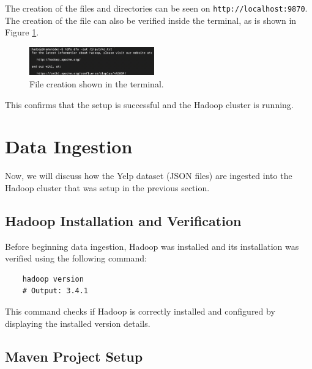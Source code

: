 \documentclass[conference]{IEEEtran}
\begin{document}
The creation of the files and directories can be seen on \texttt{http://localhost:9870}.
The creation of the file can also be verified inside the terminal, as is shown
in Figure \ref{fig:verification_of_file_creation_in_terminal}.
\begin{figure}[htbp]
    \centerline{\includegraphics[width=0.48\textwidth]{graphics/verification_of_file_creation_in_terminal.png}}
    \caption{File creation shown in the terminal.}
    \label{fig:verification_of_file_creation_in_terminal}
\end{figure}

This confirms that the setup is successful and the Hadoop cluster is running.

\section{Data Ingestion}

Now, we will discuss how the Yelp dataset (JSON files) are ingested into the Hadoop
cluster that was setup in the previous section.

\subsection{Hadoop Installation and Verification}

Before beginning data ingestion, Hadoop was installed and its installation was
verified using the following command:
\begin{verbatim}
    hadoop version
    # Output: 3.4.1
\end{verbatim}
This command checks if Hadoop is correctly installed and configured by displaying
the installed version details.

\subsection{Maven Project Setup}
\end{document}
